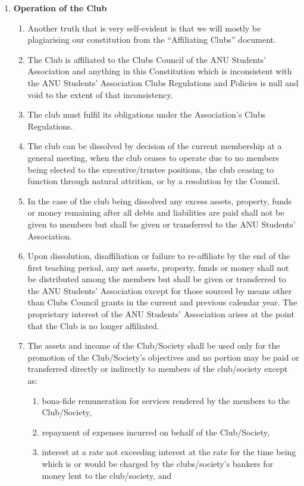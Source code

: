 \documentclass{article}
\begin{document}
\begin{enumerate}[label=\textbf{\arabic*}]
    \item \textbf{Operation of the Club}
    \begin{enumerate}[label=2.\arabic*]
        \item Another truth that is very self-evident is that we will mostly be plagiarising our constitution from the “Affiliating Clubs” document.
        \item The Club is affiliated to the Clubs Council of the ANU Students’ Association and anything in this Constitution which is inconsistent with the ANU Students’ Association Clubs Regulations and Policies is null and void to the extent of that inconsistency.
        \item The club must fulfil its obligations under the Association’s Clubs Regulations.
        \item The club can be dissolved by decision of the current membership at a general meeting, when the club ceases to operate due to no members being elected to the executive/trustee positions, the club ceasing to function through natural attrition, or by a resolution by the Council. 
        \item In the case of the club being dissolved any excess assets, property, funds or money remaining after all debts and liabilities are paid shall not be given to members but shall be given or transferred to the ANU Students’ Association.
        \item Upon dissolution, disaffiliation or failure to re-affiliate by the end of the first teaching period, any net assets, property, funds or money shall not be distributed among the members but shall be given or transferred to the ANU Students’ Association except for those sourced by means other than Clubs Council grants in the current and previous calendar year. The proprietary interest of the ANU Students’ Association arises at the point that the Club is no longer affiliated.
        \item The assets and income of the Club/Society shall be used only for the promotion of the Club/Society’s objectives and no portion may be paid or transferred directly or indirectly to members of the club/society except as:
        \begin{enumerate}[label=2.7.\arabic*]
            \item bona-fide remuneration for services rendered by the members to the Club/Society,
            \item repayment of expenses incurred on behalf of the Club/Society,
            \item interest at a rate not exceeding interest at the rate for the time being which is or would be charged by the clubs/society’s bankers for money lent to the club/society, and

\end{enumerate}
\end{enumerate}
\end{enumerate}
\end{document}
